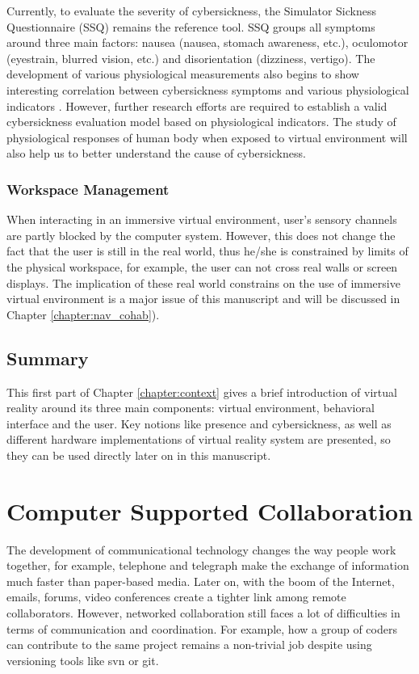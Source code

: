 Currently, to evaluate the severity of cybersickness, the Simulator Sickness Questionnaire (SSQ) \citep{Kennedy1993SSQ} remains the reference tool. SSQ groups all symptoms around three main factors: nausea (nausea, stomach awareness, etc.), oculomotor (eyestrain, blurred vision, etc.) and disorientation (dizziness, vertigo). The development of various physiological measurements also begins to show interesting correlation between cybersickness symptoms and various physiological indicators \citep{Kim2005Characteristic, Min2004Psycho, Sugita2008Quantitative}. However, further research efforts are required to establish a valid cybersickness evaluation model based on physiological indicators. The study of physiological responses of human body when exposed to virtual environment will also help us to better understand the cause of cybersickness.

\subsubsection{Workspace Management}
When interacting in an immersive virtual environment, user's sensory channels are partly blocked by the computer system. However, this does not change the fact that the user is still in the real world, thus he/she is constrained by limits of the physical workspace, for example, the user can not cross real walls or screen displays. The implication of these real world constrains on the use of immersive virtual environment is a major issue of this manuscript and will be discussed in Chapter \ref{chapter:nav_cohab}).


\subsection{Summary}
This first part of Chapter \ref{chapter:context} gives a brief introduction of virtual reality around its three main components: virtual environment, behavioral interface and the user. Key notions like presence and cybersickness, as well as different hardware implementations of virtual reality system are presented, so they can be used directly later on in this manuscript. 

\newpage

\section{Computer Supported Collaboration}
The development of communicational technology changes the way people work together, for example, telephone and telegraph make the exchange of information much faster than paper-based media. Later on, with the boom of the Internet, emails, forums, video conferences create a tighter link among remote collaborators. However, networked collaboration still faces a lot of difficulties in terms of communication and coordination. For example, how a group of coders can contribute to the same project remains a non-trivial job despite using versioning tools like svn or git.

